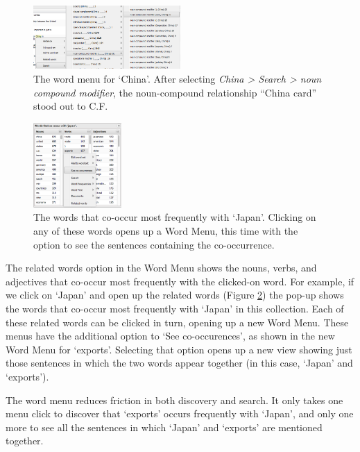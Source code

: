 \documentclass{sig-alternate}
\begin{document}
\begin{figure}[h!]
\includegraphics[width=0.5\textwidth]{fig/chris/01.png}
\caption{The word menu for `China'.   After selecting \emph{China > Search > noun compound modifier}, the noun-compound relationship ``China card'' stood out to C.F. \label{fig:chris01}}
\end{figure}


\begin{figure}[ht!]
\begin{center}
	\includegraphics[width=0.3\textwidth]{fig/intro/09.png}
\end{center}
    \caption{%
 		The words that co-occur most frequently with `Japan'. Clicking on any of these words opens up a Word Menu, this time with the option to see the sentences containing the co-occurrence.
	\label{fig:intro09}}%
\end{figure}

The related words option in the Word Menu shows the nouns, verbs, and adjectives that co-occur most frequently with the clicked-on word. For example, if we click on `Japan' and open up the related words (Figure \ref{fig:intro09}) the pop-up shows the words that co-occur most frequently with `Japan' in this collection. Each of these related words can be clicked in turn, opening up a new Word Menu. These menus have the additional option to `See co-occurences', as shown in the new Word Menu for `exports'.  Selecting that option opens up a new view showing just those sentences in which the two words appear together  (in this case, `Japan' and `exports').  

The word menu reduces friction in both discovery and search. It only takes one menu click to discover that `exports' occurs frequently with `Japan', and only one more to see all the sentences in which `Japan' and `exports' are mentioned together.  
\end{document}

